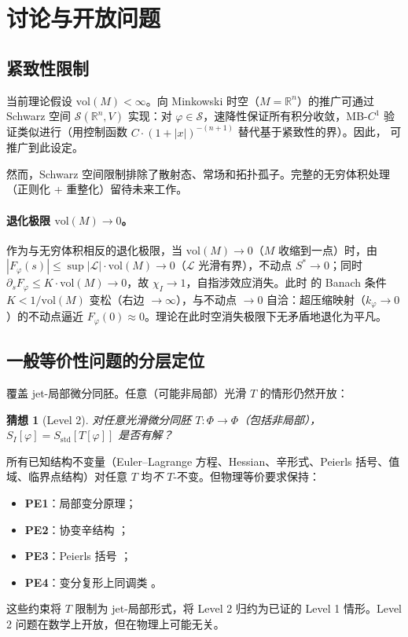 \documentclass[12pt,a4paper]{article}
\newtheorem{conjecture}[theorem]{猜想}
\theoremstyle{definition}
\newcommand{\mL}{\mathcal{L}}
\newcommand{\mS}{\mathcal{S}}
\newcommand{\mPhi}{\Phi}
\newcommand{\vol}{\mathrm{vol}}
\newcommand{\R}{\mathbb{R}}
\begin{document}
\section{讨论与开放问题}
\label{sec:discussion}

\subsection{紧致性限制}

当前理论假设 $\vol(M) < \infty$。向 Minkowski 时空（$M = \R^n$）的推广可通过 Schwarz 空间 $\mS(\R^n, V)$ 实现：对 $\varphi \in \mS$，速降性保证所有积分收敛，MB-$C^1$ 验证类似进行（用控制函数 $C \cdot (1+|x|)^{-(n+1)}$ 替代基于紧致性的界）。因此， 可推广到此设定。

然而，Schwarz 空间限制排除了散射态、常场和拓扑孤子。完整的无穷体积处理（正则化 + 重整化）留待未来工作。

\paragraph{退化极限 $\vol(M) \to 0$。}
作为与无穷体积相反的退化极限，当 $\vol(M) \to 0$（$M$ 收缩到一点）时，由 $|F_\varphi(s)| \leq \sup|\mL| \cdot \vol(M) \to 0$（$\mL$ 光滑有界），不动点 $S^* \to 0$；同时 $\partial_s F_\varphi \leq K \cdot \vol(M) \to 0$，故 $\chi_I \to 1$，自指涉效应消失。此时  的 Banach 条件 $K < 1/\vol(M)$ 变松（右边 $\to \infty$），与不动点 $\to 0$ 自洽：超压缩映射（$k_\varphi \to 0$）的不动点逼近 $F_\varphi(0) \approx 0$。理论在此时空消失极限下无矛盾地退化为平凡。

\subsection{一般等价性问题的分层定位}

 覆盖 jet-局部微分同胚。任意（可能非局部）光滑 $T$ 的情形仍然开放：

\begin{conjecture}[Level 2]
对\emph{任意}光滑微分同胚 $T: \mPhi \to \mPhi$（包括非局部），$S_I[\varphi] = S_{\mathrm{std}}[T[\varphi]]$ 是否有解？
\end{conjecture}

所有已知结构不变量（Euler--Lagrange 方程、Hessian、辛形式、Peierls 括号、值域、临界点结构）对任意 $T$ 均\emph{不} $T$-不变。但物理等价要求保持：
\begin{itemize}
\item \textbf{PE1}：局部变分原理；
\item \textbf{PE2}：协变辛结构 \cite{CrnkovicWitten1987, LeeWald1990, Khavkine2014}；
\item \textbf{PE3}：Peierls 括号 \cite{HarlowWu2019}；
\item \textbf{PE4}：变分复形上同调类 \cite{Vitolo2001, Olver1993}。
\end{itemize}
这些约束将 $T$ 限制为 jet-局部形式，将 Level 2 归约为已证的 Level 1 情形。Level 2 问题在数学上开放，但在物理上可能无关。
\end{document}
